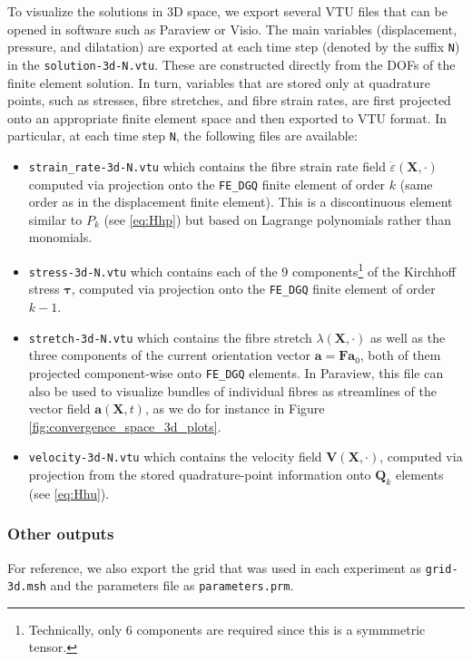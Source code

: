 \documentclass{sfuthesis}
\numberwithin{equation}{section}
\numberwithin{figure}{chapter}
\numberwithin{table}{chapter}
\theoremstyle{definition}
\def\*#1{{\mathbf{#1}}} %
\newcommand{\depsilon}{\dot{\varepsilon}}
\def\btau{{\bm{\tau}}}
\begin{document}
To visualize the solutions in 3D space, we export several VTU files that can be opened in software such as Paraview or Visio. The main variables (displacement, pressure, and dilatation) are exported at each time step (denoted by the suffix \texttt{N}) in the \texttt{solution-3d-N.vtu}. These are constructed directly from the DOFs of the finite element solution. In turn, variables that are stored only at quadrature points, such as stresses, fibre stretches, and fibre strain rates, are first projected onto an appropriate finite element space and then exported to VTU format. In particular, at each time step \texttt{N}, the following files are available:
\begin{itemize}
    \item \texttt{strain\_rate-3d-N.vtu} which contains the fibre strain rate field $\depsilon(\*X,\cdot)$ computed via projection onto the \texttt{FE\_DGQ} finite element of order $k$ (same order as in the displacement finite element). This is a discontinuous element similar to $P_k$ (see \eqref{eq:Hhp}) but based on Lagrange polynomials rather than monomials.
    \item \texttt{stress-3d-N.vtu} which contains each of the 9 components\footnote{Technically, only 6 components are required since this is a symmmetric tensor.} of the Kirchhoff stress $\btau$, computed via projection onto the \texttt{FE\_DGQ} finite element of order $k-1$.
    \item \texttt{stretch-3d-N.vtu} which contains the fibre stretch $\lambda(\*X,\cdot)$ as well as the three components of the current orientation vector $\*a = \*F \*a_0$, both of them projected component-wise onto \texttt{FE\_DGQ} elements. In Paraview, this file can also be used to visualize bundles of individual fibres as streamlines of the vector field $\*a(\*X,t)$, as we do for instance in Figure \ref{fig:convergence_space_3d_plots}.
    \item \texttt{velocity-3d-N.vtu} which contains the velocity field $\*V(\*X,\cdot)$, computed via projection from the stored quadrature-point information onto $\*Q_k$ elements (see \eqref{eq:Hhu}).
\end{itemize}

\subsubsection{Other outputs}

For reference, we also export the grid that was used in each experiment as \texttt{grid-3d.msh} and the parameters file as \texttt{parameters.prm}.
\end{document}
